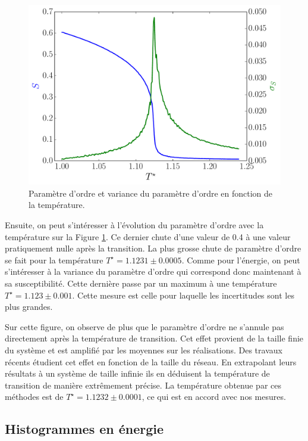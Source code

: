 \documentclass[11pt]{article}
\numberwithin{equation}{section}
\begin{document}
\begin{figure}[h!]
    \centering	    
	\includegraphics[scale=0.6]{figures/local_order.pdf}
    \caption{Paramètre d'ordre et variance du paramètre d'ordre en fonction de la température.}
    	\label{local_order} 
\end{figure}
\medskip

Ensuite, on peut s'intéresser à l'évolution du paramètre d'ordre avec la température sur la Figure \ref{local_order}. Ce dernier chute d'une valeur de 0.4 à une valeur pratiquement nulle après la transition. La plus grosse chute de paramètre d'ordre se fait pour la température $T^\star = 1.1231 \pm 0.0005$. Comme pour l'énergie, on peut s'intéresser à la variance du paramètre d'ordre qui correspond donc maintenant à sa susceptibilité. Cette dernière passe par un maximum à une température $T^\star = 1.123 \pm 0.001$. Cette mesure est celle pour laquelle les incertitudes sont les plus grandes.
\medskip
\newpage

Sur cette figure, on observe de plus que le paramètre d'ordre ne s'annule pas directement après la température de transition. Cet effet provient de la taille finie du système et est amplifié par les moyennes sur les réalisations. Des travaux récents \cite{cluster,nonb} étudient cet effet en fonction de la taille du réseau. En extrapolant leurs résultats à un système de taille infinie ils en déduisent la température de transition de manière extrêmement précise. La température obtenue par ces méthodes est de $T^\star = 1.1232 \pm 0.0001$, ce qui est en accord avec nos mesures.


\subsection{Histogrammes en énergie}
\end{document}

